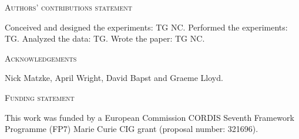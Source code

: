 \documentclass[12pt,letterpaper]{article}
\renewcommand{\section}[1]{%
\bigskip
\begin{center}
\begin{Large}
\normalfont\scshape #1
\medskip
\end{Large}
\end{center}}
\begin{document}
\section{Authors' contributions statement}
Conceived and designed the experiments: TG NC. Performed the experiments: TG. Analyzed the data: TG. Wrote the paper: TG NC. %
\section{Acknowledgements}
Nick Matzke, April Wright, David Bapst and Graeme Lloyd. %
\section{Funding statement}
This work was funded by a European Commission CORDIS Seventh Framework Programme (FP7) Marie Curie CIG grant (proposal number: 321696).





\newcommand{\beginsupplement}{%
    \setcounter{table}{0}
    \renewcommand{\thetable}{S\arabic{table}}%
    \setcounter{figure}{0}
    \renewcommand{\thefigure}{S\arabic{figure}}%
}
\beginsupplement



\end{document}

